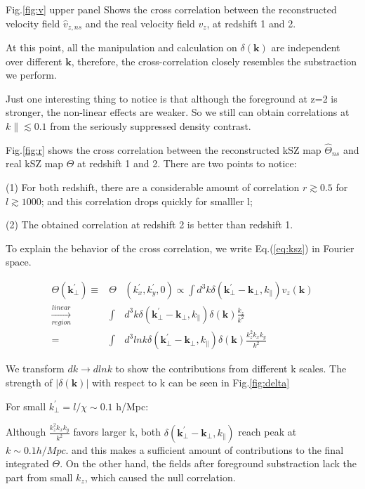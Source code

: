 Fig.\ref{fig:v} upper panel Shows the cross correlation between 
the reconstructed velocity field $\hat v_{z,ns}$ and the real velocity field $v_z$, at redshift 1 and 2. 

At this point, all the manipulation and calculation on $\delta(\bm{k})$ are independent over different $\bm{k}$, 
therefore, the cross-correlation closely resembles the substraction we perform. 

Just one interesting thing to notice is that although the foreground at z=2 is stronger, 
the non-linear effects are weaker.  
So we still can obtain correlations at $k\parallel \lesssim 0.1$ from the seriously suppressed density contrast. 

Fig.\ref{fig:r} shows the cross correlation between the reconstructed kSZ map 
$\hat\Theta_{ns}$ and real kSZ map $\Theta$ at redshift 1 and 2. 
There are two points to notice: 

(1) For both redshift, there are a considerable amount of correlation 
$r\gtrsim0.5$ for $l\gtrsim 1000$; 
and this correlation drops quickly for smalller l; 

(2) The obtained correlation at redshift 2 is better than redshift 1.

To explain the behavior of the cross correlation, we write Eq.(\ref{eq:ksz}) in Fourier space.

\begin{eqnarray}
    \Theta(\bm{k_\perp^{\prime}})\equiv&\Theta&(k_x^{\prime},k_y^{\prime},0)\propto\int d^3k\delta(\bm{k_\perp^{\prime}}-\bm{k_\perp},k_\parallel) v_z(\bm{k})\nonumber\\
    \xrightarrow[region]{linear}&\int& d^3k\delta(\bm{k_\perp^{\prime}}-\bm{k_\perp},k_\parallel)\delta(\bm{k})\frac{k_z}{k^2}\\
    =&\int&d^3lnk\delta(\bm{k_\perp^{\prime}}-\bm{k_\perp},k_\parallel)\delta(\bm{k})\frac{k_z^2k_xk_y}{k^2}\nonumber
    \end{eqnarray}

    We transform $dk\rightarrow dlnk$ 
    to show the contributions from different k scales.
    The strength of $|\delta(\bm{k})|$ with respect to k can be seen in Fig.\ref{fig:delta}

For small $k_\perp^\prime=l/\chi\sim 0.1$ h/Mpc:

Although $\frac{k_z^2k_xk_y}{k^2}$ favors larger k, both $\delta(\bm{k_\perp^{\prime}}-\bm{k_\perp},k_\parallel)$  
reach peak at $k\sim 0.1 h/Mpc$.
and this makes a sufficient amount of contributions to the final integrated $\Theta$. 
On the other hand, the fields after foreground substraction lack the part from 
small $k_z$, which caused the null correlation.

